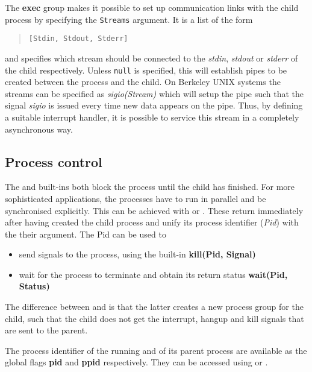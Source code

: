 The {\bf exec} group makes it possible to set up communication links
with the child process by specifying the {\tt Streams} argument.
It is a list of the form
\begin{quote}\begin{verbatim}
[Stdin, Stdout, Stderr]
\end{verbatim}\end{quote}
and specifies which {\eclipse} stream should be connected to the
{\it stdin}, {\it stdout} or {\it stderr} of the child respectively.
Unless {\tt null} is specified, this will establish pipes to be
created between the {\eclipse} process and the child.
On Berkeley UNIX systems the streams can be specified as {\it sigio(Stream)}
which will setup the pipe such that the signal {\it sigio} is issued
every time new data appears on the pipe.
Thus, by defining a suitable interrupt handler, it is possible to service this
stream in a completely asynchronous way.

\subsection{Process control}
The  and  built-ins both block the {\eclipse} process until
the child has finished.
For more sophisticated applications, the processes have to run in parallel
and be synchronised explicitly.
This can be achieved with  or .
These return immediately after having created the child process and
unify its process identifier ({\it Pid}) with the their argument.
The Pid can be used to 
\begin{itemize}
\item send signals to the process, using the built-in {\bf kill(Pid, Signal)}
\item wait for the process to terminate and obtain its return status
{\bf wait(Pid, Status)}
\end{itemize}
The difference between  and  is
that the latter creates a
new process group for the child, such that the child does not get the
interrupt, hangup and kill signals that are sent to the parent.

The process identifier of the running {\eclipse} and of its parent process are
available as the global flags {\bf pid} and {\bf ppid} respectively.
They can be accessed using  or .

